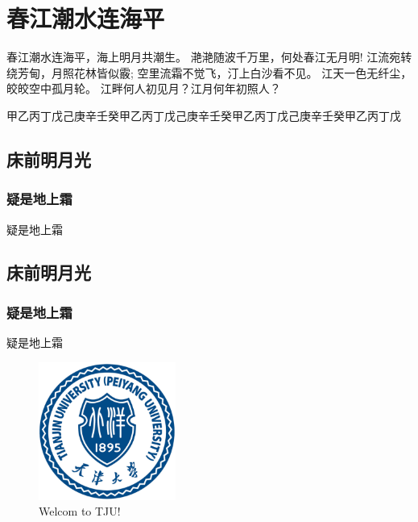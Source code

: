 \chapter{春江潮水连海平}
春江潮水连海平，海上明月共潮生。
滟滟随波千万里，何处春江无月明!
江流宛转绕芳甸，月照花林皆似霰;
空里流霜不觉飞，汀上白沙看不见。
江天一色无纤尘，皎皎空中孤月轮。
江畔何人初见月？江月何年初照人？

甲乙丙丁戊己庚辛壬癸甲乙丙丁戊己庚辛壬癸甲乙丙丁戊己庚辛壬癸甲乙丙丁戊

\section{床前明月光}
\subsection{疑是地上霜}
疑是地上霜

\section{床前明月光}
\subsection{疑是地上霜}
疑是地上霜

\begin{figure}[htbp]
\centering
\includegraphics[width=0.4\textwidth]{Thesis/figures/tjulogo.eps}
\caption{Welcom to TJU!}
\end{figure}
